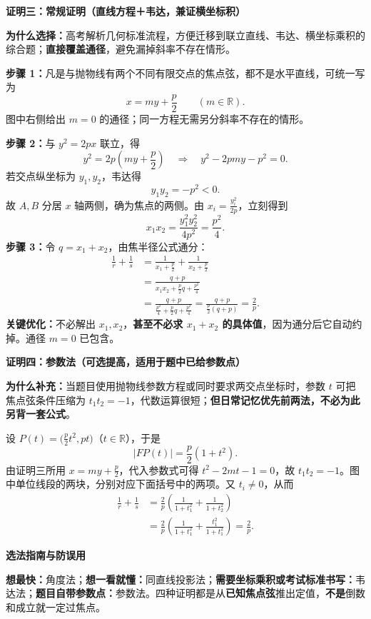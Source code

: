 \clearpage
\begin{proofbox}
\textbf{\textcolor{CProof}{证明三：常规证明（直线方程＋韦达，兼证横坐标积）}}

\textbf{为什么选择：}高考解析几何标准流程，方便迁移到联立直线、韦达、横坐标乘积的综合题；\textbf{直接覆盖通径}，避免漏掉斜率不存在情形。

\begin{center}\end{center}

\textbf{步骤 1：}凡是与抛物线有两个不同有限交点的焦点弦，都不是水平直线，可统一写为
\[
 \boxed{x=my+\frac p2}\qquad(m\in\mathbb R).
\]
图中右侧给出 $m=0$ 的通径；同一方程无需另分斜率不存在的情形。

\textbf{步骤 2：}与 $y^2=2px$ 联立，得
\[
 y^2=2p\left(my+\frac p2\right)
 \quad\Longrightarrow\quad y^2-2pmy-p^2=0.
\]
若交点纵坐标为 $y_1,y_2$，韦达得
\[
 y_1y_2=-p^2<0.
\]
故 $A,B$ 分居 $x$ 轴两侧，确为焦点的两侧。由 $x_i=\frac{y_i^2}{2p}$，立刻得到
\[
 \boxed{x_1x_2=\frac{y_1^2y_2^2}{4p^2}=\frac{p^2}{4}}.
\]
\textbf{步骤 3：}令 $q=x_1+x_2$，由焦半径公式通分：
\[
 \begin{aligned}
 \frac1r+\frac1s
 &=\frac1{x_1+\frac p2}+\frac1{x_2+\frac p2}\\
 &=\frac{q+p}{x_1x_2+\frac p2q+\frac{p^2}{4}}\\
 &=\frac{q+p}{\frac{p^2}{4}+\frac p2q+\frac{p^2}{4}}
 =\frac{q+p}{\frac p2(q+p)}
 =\boxed{\frac2p}.
 \end{aligned}
\]
\textbf{关键优化：}不必解出 $x_1,x_2$，\textbf{甚至不必求 $x_1+x_2$ 的具体值}，因为通分后它自动约掉。通径 $m=0$ 已包含。

\bigskip
\end{proofbox}
\clearpage
\begin{proofbox}
\textbf{\textcolor{CProof}{证明四：参数法（可选提高，适用于题中已给参数点）}}

\textbf{为什么补充：}当题目使用抛物线参数方程或同时要求两交点坐标时，参数 $t$ 可把焦点弦条件压缩为 $t_1t_2=-1$，代数运算很短；\textbf{但日常记忆优先前两法，不必为此另背一套公式}。

\begin{center}\end{center}

设 $P(t)=\bigl(\frac p2t^2,pt\bigr)$（$t\in\mathbb R$），于是
\[
 |FP(t)|=\frac p2(1+t^2).
\]
由证明三所用 $x=my+\frac p2$，代入参数式可得 $t^2-2mt-1=0$，故 $t_1t_2=-1$。图中单位线段的两块，分别对应下面括号中的两项。又 $t_i\ne0$，从而
\[
 \begin{aligned}
 \frac1r+\frac1s
 &=\frac2p\left(\frac1{1+t_1^2}+\frac1{1+t_2^2}\right)\\
 &=\frac2p\left(\frac1{1+t_1^2}+\frac{t_1^2}{1+t_1^2}\right)
 =\boxed{\frac2p}.
 \end{aligned}
\]

\bigskip
\textbf{\textcolor{CProof}{选法指南与防误用}}

\textbf{想最快：}角度法；\textbf{想一看就懂：}同直线投影法；\textbf{需要坐标乘积或考试标准书写：}韦达法；\textbf{题目自带参数点：}参数法。四种证明都是从\textbf{已知焦点弦}推出定值，\textbf{不是}倒数和成立就一定过焦点。
\end{proofbox}
